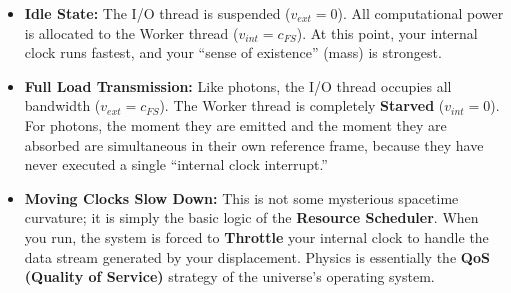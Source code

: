 \begin{itemize}
\item \textbf{Idle State:} The I/O thread is suspended (\textbf{$v_{ext}=0$}). All computational power is allocated to the Worker thread (\textbf{$v_{int}=c_{FS}$}). At this point, your internal clock runs fastest, and your ``sense of existence'' (mass) is strongest.

\item \textbf{Full Load Transmission:} Like photons, the I/O thread occupies all bandwidth (\textbf{$v_{ext}=c_{FS}$}). The Worker thread is completely \textbf{Starved} (\textbf{$v_{int}=0$}). For photons, the moment they are emitted and the moment they are absorbed are simultaneous in their own reference frame, because they have never executed a single ``internal clock interrupt.''

\item \textbf{Moving Clocks Slow Down:} This is not some mysterious spacetime curvature; it is simply the basic logic of the \textbf{Resource Scheduler}. When you run, the system is forced to \textbf{Throttle} your internal clock to handle the data stream generated by your displacement. Physics is essentially the \textbf{QoS (Quality of Service)} strategy of the universe's operating system.
\end{itemize}

